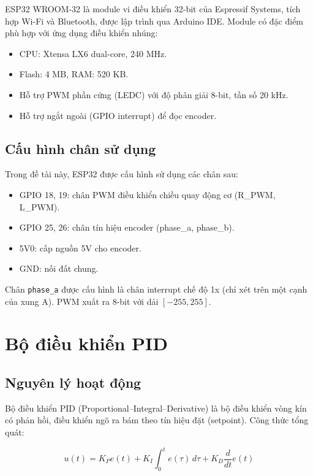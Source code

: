 ESP32 WROOM-32 là module vi điều khiển 32-bit của Espressif Systems, tích hợp
Wi-Fi và Bluetooth, được lập trình qua Arduino IDE. Module có đặc điểm phù hợp
với ứng dụng điều khiển nhúng:

\begin{itemize}
    \item CPU: Xtensa LX6 dual-core, 240 MHz.
    \item Flash: 4 MB, RAM: 520 KB.
    \item Hỗ trợ PWM phần cứng (LEDC) với độ phân giải 8-bit, tần số 20 kHz.
    \item Hỗ trợ ngắt ngoài (GPIO interrupt) để đọc encoder.
\end{itemize}

\subsection{Cấu hình chân sử dụng}

Trong đề tài này, ESP32 được cấu hình sử dụng các chân sau:
\begin{itemize}
    \item GPIO 18, 19: chân PWM điều khiển chiều quay động cơ (R\_PWM, L\_PWM).
    \item GPIO 25, 26: chân tín hiệu encoder (phase\_a, phase\_b).
    \item 5V0: cấp nguồn 5V cho encoder.
    \item GND: nối đất chung.
\end{itemize}

Chân \texttt{phase\_a} được cấu hình là chân interrupt chế độ 1x
(chỉ xét trên một cạnh của xung A). PWM xuất ra 8-bit với dải $[-255, 255]$.


\section{Bộ điều khiển PID}

\subsection{Nguyên lý hoạt động}

Bộ điều khiển PID (Proportional--Integral--Derivative) là bộ điều khiển vòng kín
có phản hồi, điều khiển ngõ ra bám theo tín hiệu đặt (setpoint). Công thức tổng quát:

\begin{equation}
    u(t) = K_P e(t) + K_I \int_0^t e(\tau)\,d\tau + K_D \frac{d}{dt}e(t)
    \label{eq:pid}
\end{equation}


